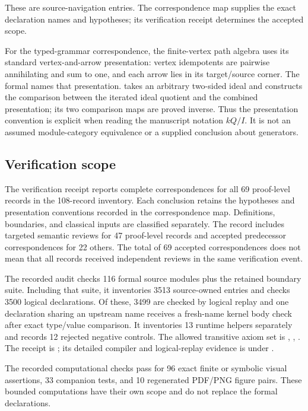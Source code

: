 These are source-navigation entries. The correspondence map supplies the exact declaration names and hypotheses; its verification receipt determines the accepted scope.

For the typed-grammar correspondence, the finite-vertex path algebra uses its standard vertex-and-arrow presentation: vertex idempotents are pairwise annihilating and sum to one, and each arrow lies in its target/source corner. The formal  names that presentation.  takes an arbitrary two-sided ideal and constructs the comparison between the iterated ideal quotient and the combined presentation; its two comparison maps are proved inverse. Thus the presentation convention is explicit when reading the manuscript notation $kQ/I$. It is not an assumed module-category equivalence or a supplied conclusion about generators.



\subsection{Verification scope}

The verification receipt reports complete correspondences for all 69 proof-level records in the 108-record inventory. Each conclusion retains the hypotheses and presentation conventions recorded in the correspondence map. Definitions, boundaries, and classical inputs are classified separately. The record includes targeted semantic reviews for 47 proof-level records and accepted predecessor correspondences for 22 others. The total of 69 accepted correspondences does not mean that all records received independent reviews in the same verification event.

The recorded audit checks 116 formal source modules plus the retained boundary suite. Including that suite, it inventories 3513 source-owned entries and checks 3500 logical declarations. Of these, 3499 are checked by logical replay and one declaration sharing an upstream name receives a fresh-name kernel body check after exact type/value comparison. It inventories 13 runtime helpers separately and records 12 rejected negative controls. The allowed transitive axiom set is , , . The receipt is ; its detailed compiler and logical-replay evidence is under .

The recorded computational checks pass for 96 exact finite or symbolic visual assertions, 33 companion tests, and 10 regenerated PDF/PNG figure pairs. These bounded computations have their own scope and do not replace the formal declarations.

